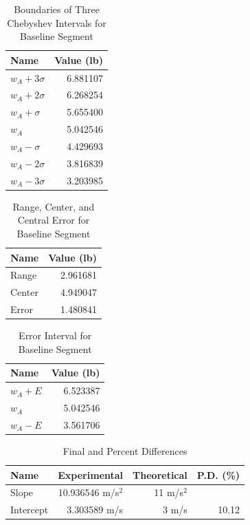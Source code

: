 %
\begin{table}[ht]
    \centering
    \begin{tabular}{l|r}
        \textbf{Name} & \textbf{Value} (lb) \\
        \hline
        $w_{A} + 3 \sigma$ & 6.881107 \\
        $w_{A} + 2 \sigma$ & 6.268254 \\
        $w_{A} + \sigma$ & 5.655400 \\
        \hline
        $w_{A}$ & 5.042546 \\
        \hline
        $w_{A} - \sigma$ & 4.429693 \\
        $w_{A} - 2 \sigma$ & 3.816839 \\
        $w_{A} - 3 \sigma$ & 3.203985 \\
        \hline
    \end{tabular}
    \caption{Boundaries of Three Chebyshev Intervals for Baseline Segment}
    \label{table:00.baseline.chebyshev}
\end{table}
\newpage
%
\begin{table}[ht]
    \centering
    \begin{tabular}{l|r}
        \textbf{Name} & \textbf{Value} (lb) \\
		\hline
		Range & 2.961681 \\
	    Center & 4.949047 \\
		Error & 1.480841 \\
		\hline
	\end{tabular}
    \caption{Range, Center, and Central Error for Baseline Segment}
    \label{table:00.baseline.range}
\end{table}
%
\begin{table}[ht]
    \centering
    \begin{tabular}{l|r} 
        \textbf{Name} & \textbf{Value} (lb) \\
		\hline
        $w_{A} + E$ & 6.523387 \\
        $w_{A}$ & 5.042546 \\
        $w_{A} - E$ & 3.561706 \\
		\hline
	\end{tabular}
    \caption{Error Interval for Baseline Segment}
    \label{table:00.baseline.interval}
\end{table}
%
\begin{table}[ht]
    \centering
    \begin{tabular}{l|r|r|r}
        \textbf{Name} & \textbf{Experimental} & \textbf{Theoretical} & \textbf{P.D.} (\%) \\
        \hline
        Slope & 10.936546 m/s$^{2}$ & 11 m/s$^{2}$ & \textminus 0.58 \\
        Intercept & 3.303589 m/s & 3 m/s & 10.12 \\
        \hline
    \end{tabular}
    \caption{Final and Percent Differences}
    \label{table:00.velocity.results}
\end{table}
